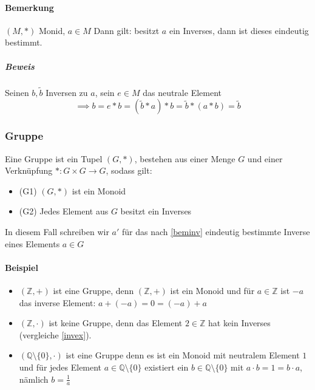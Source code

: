 \documentclass[a4paper]{scrartcl}
\theoremstyle{definition}
\theoremstyle{plain}
\theoremstyle{plain}
\theoremstyle{remark}
\theoremstyle{remark}
\theoremstyle{remark}
\theoremstyle{remark}
\theoremstyle{remark}
\begin{document}
\paragraph{Bemerkung}
\label{sec-3-1-3-2}
\label{beminv}
$(M,*)$ Monid, $a\in M$ Dann gilt: besitzt $a$ ein Inverses, dann ist dieses eindeutig bestimmt.
\subparagraph{Beweis}
\label{sec-3-1-3-2-1}
Seinen $b,\tilde b$ Inversen zu $a$, sein $e\in M$ das neutrale Element
\[\implies b = e * b = (\tilde b * a) * b = \tilde b * (a * b) = \tilde b\]
\subsubsection{Gruppe}
\label{sec-3-1-4}
Eine Gruppe ist ein Tupel $(G,*)$, bestehen aus einer Menge $G$ und einer Verknüpfung $*:G\times G \to G$, sodass gilt:
\begin{itemize}
\item (G1) $(G,*)$ ist ein Monoid
\item (G2) Jedes Element aus $G$ besitzt ein Inverses
\end{itemize}
In diesem Fall schreiben wir $a'$ für das nach \ref{beminv} eindeutig bestimmte Inverse eines Elements $a\in G$
\paragraph{Beispiel}
\label{sec-3-1-4-1}
\begin{itemize}
\item $(\mathbb{Z},+)$ ist eine Gruppe, denn $(\mathbb{Z},+)$ ist ein Monoid und für $a\in\mathbb{Z}$ ist $-a$ das inverse Element: $a + (-a) = 0 = (-a) + a$
\item $(\mathbb{Z},\cdot)$ ist keine Gruppe, denn das Element $2\in\mathbb{Z}$ hat kein Inverses (vergleiche \ref{invex}).
\item $(\mathbb{Q}\setminus \{0\},\cdot)$ ist eine Gruppe denn es ist ein Monoid mit neutralem Element $1$ und für jedes Element $a\in\mathbb{Q}\setminus\{0\}$ existiert ein $b\in \mathbb{Q}\setminus \{0\}$ mit $a\cdot b = 1 = b\cdot a$, nämlich $b = \frac{1}{a}$
\end{itemize}
\end{document}
